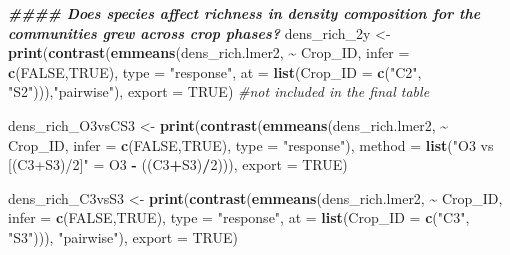 \documentclass[
]{article}
\newenvironment{Shaded}{\begin{snugshade}}{\end{snugshade}}
\newcommand{\AttributeTok}[1]{\textcolor[rgb]{0.13,0.29,0.53}{#1}}
\newcommand{\CommentTok}[1]{\textcolor[rgb]{0.56,0.35,0.01}{\textit{#1}}}
\newcommand{\ConstantTok}[1]{\textcolor[rgb]{0.56,0.35,0.01}{#1}}
\newcommand{\DecValTok}[1]{\textcolor[rgb]{0.00,0.00,0.81}{#1}}
\newcommand{\DocumentationTok}[1]{\textcolor[rgb]{0.56,0.35,0.01}{\textbf{\textit{#1}}}}
\newcommand{\FunctionTok}[1]{\textcolor[rgb]{0.13,0.29,0.53}{\textbf{#1}}}
\newcommand{\NormalTok}[1]{#1}
\newcommand{\OtherTok}[1]{\textcolor[rgb]{0.56,0.35,0.01}{#1}}
\newcommand{\SpecialCharTok}[1]{\textcolor[rgb]{0.81,0.36,0.00}{\textbf{#1}}}
\newcommand{\StringTok}[1]{\textcolor[rgb]{0.31,0.60,0.02}{#1}}
\begin{document}
\begin{Shaded}
\begin{Highlighting}[]
\DocumentationTok{\#\#\#\# Does species affect richness in density composition for the communities grew across crop phases?}
\NormalTok{dens\_rich\_2y }\OtherTok{\textless{}{-}} \FunctionTok{print}\NormalTok{(}\FunctionTok{contrast}\NormalTok{(}\FunctionTok{emmeans}\NormalTok{(dens\_rich.lmer2, }\SpecialCharTok{\textasciitilde{}}\NormalTok{ Crop\_ID,}
                                       \AttributeTok{infer =} \FunctionTok{c}\NormalTok{(}\ConstantTok{FALSE}\NormalTok{,}\ConstantTok{TRUE}\NormalTok{),}
                                       \AttributeTok{type =} \StringTok{"response"}\NormalTok{,}
                                       \AttributeTok{at =} \FunctionTok{list}\NormalTok{(}\AttributeTok{Crop\_ID =} \FunctionTok{c}\NormalTok{(}\StringTok{"C2"}\NormalTok{, }\StringTok{"S2"}\NormalTok{))),}\StringTok{"pairwise"}\NormalTok{), }\AttributeTok{export =} \ConstantTok{TRUE}\NormalTok{)  }\CommentTok{\#not included in the final table}

\NormalTok{dens\_rich\_O3vsCS3 }\OtherTok{\textless{}{-}} \FunctionTok{print}\NormalTok{(}\FunctionTok{contrast}\NormalTok{(}\FunctionTok{emmeans}\NormalTok{(dens\_rich.lmer2, }\SpecialCharTok{\textasciitilde{}}\NormalTok{ Crop\_ID,}
                                            \AttributeTok{infer =} \FunctionTok{c}\NormalTok{(}\ConstantTok{FALSE}\NormalTok{,}\ConstantTok{TRUE}\NormalTok{), }
                                            \AttributeTok{type =} \StringTok{"response"}\NormalTok{), }
                                    \AttributeTok{method =} \FunctionTok{list}\NormalTok{(}\StringTok{"O3 vs [(C3+S3)/2]"} \OtherTok{=}\NormalTok{ O3 }\SpecialCharTok{{-}}\NormalTok{ ((C3}\SpecialCharTok{+}\NormalTok{S3)}\SpecialCharTok{/}\DecValTok{2}\NormalTok{))), }\AttributeTok{export =} \ConstantTok{TRUE}\NormalTok{)}
  
\NormalTok{dens\_rich\_C3vsS3 }\OtherTok{\textless{}{-}} \FunctionTok{print}\NormalTok{(}\FunctionTok{contrast}\NormalTok{(}\FunctionTok{emmeans}\NormalTok{(dens\_rich.lmer2, }\SpecialCharTok{\textasciitilde{}}\NormalTok{ Crop\_ID, }\AttributeTok{infer =} \FunctionTok{c}\NormalTok{(}\ConstantTok{FALSE}\NormalTok{,}\ConstantTok{TRUE}\NormalTok{),}
                                           \AttributeTok{type =} \StringTok{"response"}\NormalTok{, }
                                           \AttributeTok{at =} \FunctionTok{list}\NormalTok{(}\AttributeTok{Crop\_ID =} \FunctionTok{c}\NormalTok{(}\StringTok{"C3"}\NormalTok{, }\StringTok{"S3"}\NormalTok{))), }\StringTok{"pairwise"}\NormalTok{),}
                          \AttributeTok{export =} \ConstantTok{TRUE}\NormalTok{)}


\end{Highlighting}
\end{Shaded}
\end{document}
